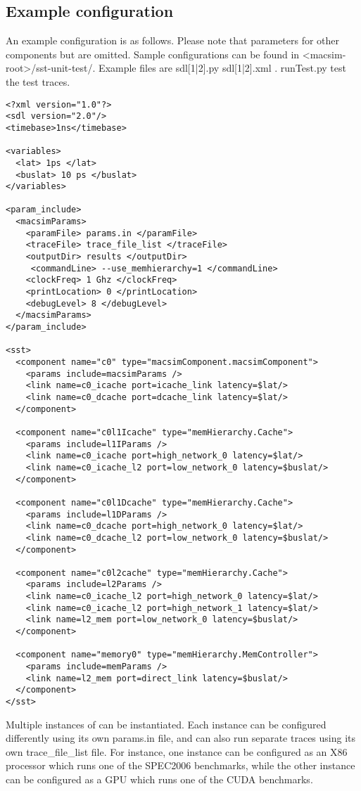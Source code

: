 \subsection{Example configuration}

An example configuration is as follows.
Please note that parameters for other components but \SIM are omitted.
Sample configurations can be found in
<macsim-root>/sst-unit-test/.
Example files are sdl[1|2].py sdl[1|2].xml . runTest.py test the test
traces. 

\begin{Verbatim}
<?xml version="1.0"?>
<sdl version="2.0"/>
<timebase>1ns</timebase>

<variables>
  <lat> 1ps </lat>
  <buslat> 10 ps </buslat>
</variables>

<param_include>
  <macsimParams>
    <paramFile> params.in </paramFile>
    <traceFile> trace_file_list </traceFile>
    <outputDir> results </outputDir>
     <commandLine> --use_memhierarchy=1 </commandLine>
    <clockFreq> 1 Ghz </clockFreq>
    <printLocation> 0 </printLocation>
    <debugLevel> 8 </debugLevel>
  </macsimParams>
</param_include>

<sst>
  <component name="c0" type="macsimComponent.macsimComponent">
    <params include=macsimParams />
    <link name=c0_icache port=icache_link latency=$lat/>
    <link name=c0_dcache port=dcache_link latency=$lat/>
  </component>

  <component name="c0l1Icache" type="memHierarchy.Cache">
    <params include=l1IParams />
    <link name=c0_icache port=high_network_0 latency=$lat/>
    <link name=c0_icache_l2 port=low_network_0 latency=$buslat/>
  </component>

  <component name="c0l1Dcache" type="memHierarchy.Cache">
    <params include=l1DParams />
    <link name=c0_dcache port=high_network_0 latency=$lat/>
    <link name=c0_dcache_l2 port=low_network_0 latency=$buslat/>
  </component>

  <component name="c0l2cache" type="memHierarchy.Cache">
    <params include=l2Params />
    <link name=c0_icache_l2 port=high_network_0 latency=$lat/>
    <link name=c0_icache_l2 port=high_network_1 latency=$lat/>
    <link name=l2_mem port=low_network_0 latency=$buslat/>
  </component>

  <component name="memory0" type="memHierarchy.MemController">
    <params include=memParams />
    <link name=l2_mem port=direct_link latency=$buslat/>
  </component>
</sst>
\end{Verbatim}
Multiple instances of \SIM can be instantiated.
Each instance can be configured differently using its own params.in file, and can also run separate traces using its own trace\_file\_list file.
For instance, one \SIM instance can be configured as an X86 processor which runs one of the SPEC2006 benchmarks, while the other \SIM instance can be configured as a GPU which runs one of the CUDA benchmarks. 

